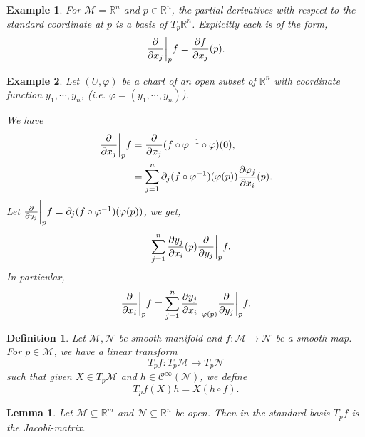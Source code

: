 \documentclass[8pt]{article}
\newtheorem{definition}{Definition}[section]
\newtheorem{lemma}{Lemma}[section]
\newtheorem{example}{Example}[section]
\newcommand{\R}[0]{\mathbb{R}}
\newcommand{\M}[0]{\mathcal{M}}
\newcommand{\cinf}[0]{\mathcal{C}^\infty}
\newcommand{\pd}[2]{{\frac {\partial #1} {\partial #2}}}
\begin{document}
\begin{example}
  For $\M = \R^n$ and $p\in\R^n$, the partial derivatives with respect to the standard coordinate at $p$ is a basis of $T_p\R^n$. Explicitly each is of the form,
  \begin{equation*}
    {\frac {\partial } {\partial x_j}}\bigg{|}_pf = {\frac {\partial f} {\partial x_j}}(p).
  \end{equation*}
\end{example}
\begin{example}
  \label{example_jacobian}
  Let $(U,\varphi)$ be a chart of an open subset of $\R^n$ with coordinate function $y_1,\cdots, y_n$, (i.e. $\varphi=(y_1,\cdots,y_n)$).
  \par We have 
  \begin{align*}
    \pd{}{x_j}\bigg{|}_pf &= \pd{}{x_j}(f\circ\varphi^{-1}\circ\varphi)(0),\\
    & = \sum_{j=1}^n\partial_j(f\circ\varphi^{-1})(\varphi(p))\pd{\varphi_j}{x_i}(p).
  \end{align*}
  Let $\pd{}{y_j}\bigg{|}_pf = \partial_j(f\circ\varphi^{-1})(\varphi(p))$, we get,
  \begin{equation*}
    =\sum_{j=1}^n \pd{y_j}{x_i}(p)\pd{}{y_j}\bigg{|}_pf.
  \end{equation*}
  In particular,
  \begin{equation*}
  \pd{}{x_i}\bigg{|}_pf  =\sum_{j=1}^n \pd{y_j}{x_i}\bigg{|}_{\varphi(p)}\pd{}{y_j}\bigg{|}_pf.
  \end{equation*}
\end{example}
\begin{definition}
  Let $\M,\mathcal{N}$ be smooth manifold and $f:\M\to\mathcal{N}$ be a smooth map. For $p\in\M$, we have a linear transform
  \begin{equation*}
    T_pf:T_p\M\to T_p\mathcal{N}
  \end{equation*}
  such that given $X\in T_p\M$ and $h\in\cinf(\mathcal{N})$, we define 
  \begin{equation*}
    T_pf(X)h = X(h\circ f).
  \end{equation*}
  \label{induced_linear_transform_tangent_space}
\end{definition}

\begin{lemma}
  \label{lemma_jacobian}
  Let $\M\subseteq\R^m$ and $\mathcal{N}\subseteq\R^n$ be open. Then in the standard basis $T_pf$ is the Jacobi-matrix.
\end{lemma}
\end{document}
